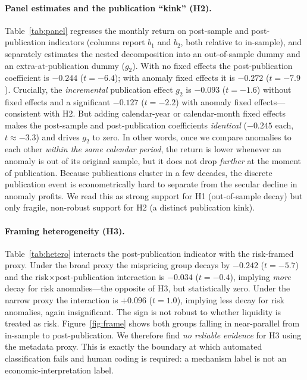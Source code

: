 \documentclass[12pt]{article}
\begin{document}
\paragraph{Panel estimates and the publication ``kink'' (H2).} Table~\ref{tab:panel} regresses
the monthly return on post-sample and post-publication indicators (columns report
$b_1$ and $b_2$, both relative to in-sample), and separately estimates the nested
\citet{mcleanpontiff2016} decomposition into an out-of-sample dummy and an extra-at-publication
dummy ($g_2$). With no fixed effects the post-publication coefficient is $-0.244$ ($t=-6.4$);
with anomaly fixed effects it is $-0.272$ ($t=-7.9$). Crucially, the \emph{incremental}
publication effect $g_2$ is $-0.093$ ($t=-1.6$) without fixed effects and a significant
$-0.127$ ($t=-2.2$) with anomaly fixed effects---consistent with H2. But adding calendar-year
or calendar-month fixed effects makes the post-sample and post-publication coefficients
\emph{identical} ($-0.245$ each, $t\approx-3.3$) and drives $g_2$ to zero. In other words, once
we compare anomalies to each other \emph{within the same calendar period}, the return is lower
whenever an anomaly is out of its original sample, but it does not drop \emph{further} at the
moment of publication. Because publications cluster in a few decades, the discrete publication
event is econometrically hard to separate from the secular decline in anomaly profits. We read
this as strong support for H1 (out-of-sample decay) but only fragile, non-robust support for
H2 (a distinct publication kink).

\paragraph{Framing heterogeneity (H3).} Table~\ref{tab:hetero} interacts the post-publication
indicator with the risk-framed proxy. Under the broad proxy the mispricing group decays by
$-0.242$ ($t=-5.7$) and the risk$\times$post-publication interaction is $-0.034$ ($t=-0.4$),
implying \emph{more} decay for risk anomalies---the opposite of H3, but statistically zero.
Under the narrow proxy the interaction is $+0.096$ ($t=1.0$), implying less decay for risk
anomalies, again insignificant. The sign is not robust to whether liquidity is treated as risk.
Figure~\ref{fig:frame} shows both groups falling in near-parallel from in-sample to
post-publication. We therefore find \emph{no reliable evidence} for H3 using the metadata
proxy. This is exactly the boundary at which automated classification fails and human coding
is required: a mechanism label is not an economic-interpretation label.
\end{document}
